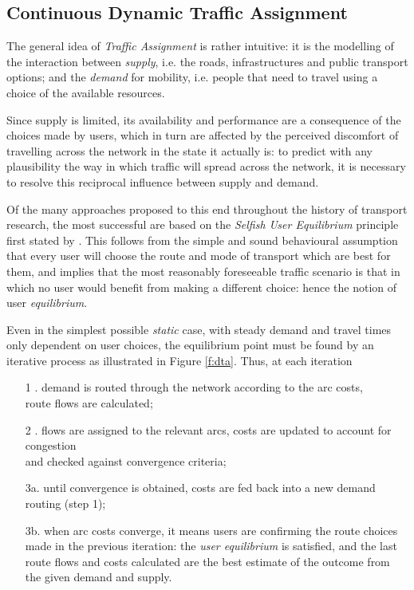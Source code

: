 \subsection{Continuous Dynamic Traffic Assignment}
The general idea of \emph{Traffic Assignment} is rather intuitive: it is the modelling of the interaction between \emph{supply}, i.e. the roads, infrastructures and public transport options; and the \emph{demand} for mobility, i.e. people that need to travel using a choice of the available resources.

Since supply is limited, its availability and performance are a consequence of the choices made by users, which in turn are affected by the perceived discomfort of travelling across the network in the state it actually is: to predict with any plausibility the way in which traffic will spread across the network, it is necessary to resolve this reciprocal influence between supply and demand.

Of the many approaches proposed to this end throughout the history of transport research, the most successful are based on the \emph{Selfish User Equilibrium} principle first stated by \cite{wardrop1952}. This follows from the simple and sound behavioural assumption that every user will choose the route and mode of transport which are best for them, and implies that the most reasonably foreseeable traffic scenario is that in which no user would benefit from making a different choice: hence the notion of user \emph{equilibrium}.


Even in the simplest possible \emph{static} case, with steady demand and travel times only dependent on user choices, the equilibrium point must be found by an iterative process as illustrated in Figure \ref{f:dta}. Thus, at each iteration 
\begin{enumerate}
\item[1 .] demand is routed through the network according to the arc costs, \\
route flows are calculated;
\item[2 .] flows are assigned to the relevant arcs, costs are updated to account for congestion\\ and checked against convergence criteria;
\item[3a.] until convergence is obtained, costs are fed back into a new demand routing (step 1);
\item[3b.] when arc costs converge, it means users are confirming the route choices made in the previous iteration: the \emph{user equilibrium} is satisfied, and the last route flows and costs calculated are the best estimate of the outcome from the given demand and supply.
\end{enumerate} 

